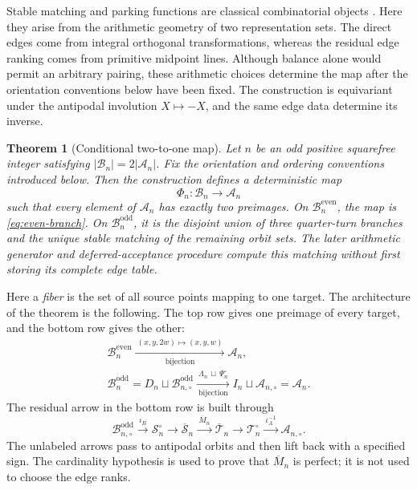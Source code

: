 \documentclass[11pt]{amsart}
\newtheorem{theorem}{Theorem}[section]
\theoremstyle{definition}
\theoremstyle{remark}
\newcommand{\Bn}{\mathcal B_n}
\newcommand{\An}{\mathcal A_n}
\newcommand{\Bodd}{\mathcal B_n^{\mathrm{odd}}}
\newcommand{\Beven}{\mathcal B_n^{\mathrm{even}}}
\newcommand{\Boddres}{\mathcal B_{n,\circ}^{\mathrm{odd}}}
\newcommand{\Ares}{\mathcal A_{n,\circ}}
\newcommand{\Sres}{\mathcal S_n^{\circ}}
\newcommand{\Tres}{\mathcal T_n^{\circ}}
\newcommand{\Sbar}{\overline{\mathcal S}_n}
\newcommand{\Tbar}{\overline{\mathcal T}_n}
\begin{document}
Stable matching and parking functions are classical combinatorial objects
\cite{GaleShapley,GusfieldIrving,KonheimWeiss,StanleyParking}.  Here they arise
from the arithmetic geometry of two representation sets.  The direct edges
come from integral orthogonal transformations, whereas the residual edge
ranking comes from primitive midpoint lines.  Although balance alone would
permit an arbitrary pairing, these arithmetic choices determine the map after
the orientation conventions below have been fixed.  The construction is
equivariant under the antipodal involution $X\mapsto-X$, and the same edge data
determine its inverse.

\begin{theorem}[Conditional two-to-one map]\label{thm:main}
Let $n$ be an odd positive squarefree integer satisfying
$|\Bn|=2|\An|$.  Fix the orientation and ordering conventions introduced
below.  Then the construction defines a deterministic map
\[
 \Phi_n:\Bn\longrightarrow\An
\]
such that every element of $\An$ has exactly two preimages.  On $\Beven$, the
map is \eqref{eq:even-branch}.  On $\Bodd$, it is the disjoint union of three
quarter-turn branches and the unique stable matching of the remaining orbit
sets.  The later arithmetic generator and deferred-acceptance procedure compute
this matching without first storing its complete edge table.
\end{theorem}

Here a \emph{fiber} is the set of all source points mapping to one target.  The
architecture of the theorem is the following.  The top row gives one preimage
of every target, and the bottom row gives the other:
\begin{equation}\label{eq:master-map}
\begin{gathered}
 \Beven\xrightarrow[\text{bijection}]{\ (x,y,2w)\mapsto(x,y,w)\ }\An,
 \\[4pt]
 \Bodd=D_n\sqcup\Boddres
 \xrightarrow[\text{bijection}]{\ \Lambda_n\,\sqcup\,\Psi_n^{\circ}\ }
 I_n\sqcup\Ares=\An.
\end{gathered}
\end{equation}
The residual arrow in the bottom row is built through
\begin{equation}\label{eq:residual-flow}
 \Boddres\xrightarrow{\ \iota_B\ }\Sres
 \longrightarrow\Sbar
 \xrightarrow{\ \overline M_n\ }\Tbar
 \longrightarrow\Tres
 \xrightarrow{\ \iota_A^{-1}\ }\Ares.
\end{equation}
The unlabeled arrows pass to antipodal orbits and then lift back with a
specified sign.  The cardinality hypothesis is used to prove that
$\overline M_n$ is perfect; it is not used to choose the edge ranks.
\end{document}
